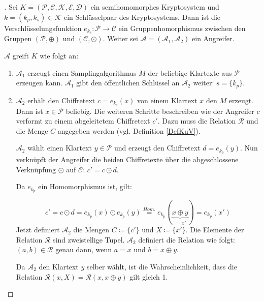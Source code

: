 \begin{proof}[]
 Sei $K = (\mathcal{P},\mathcal{C},\mathcal{K},\mathcal{E},\mathcal{D})$ ein semihomomorphes Kryptosystem und $k=(k_p,k_s)\in\mathcal{K}$ ein Schlüsselpaar des Kryptosystems. Dann ist die Verschlüsselungsfunktion $e_{k_s}:\mathcal{P}\rightarrow\mathcal{C}$ ein Gruppenhomorphismus zwischen den Gruppen $(\mathcal{P},\oplus)$ und $(\mathcal{C},\odot)$. Weiter sei $\mathcal{A} = (\mathcal{A}_1,\mathcal{A}_2)$ ein Angreifer.
 
$\mathcal{A}$ greift $K$ wie folgt an:
 
 \begin{enumerate}
 	\item $\mathcal{A}_1$ erzeugt einen Samplingalgorithmus $M$ der beliebige Klartexte aus $\mathcal{P}$ erzeugen kann. $\mathcal{A}_1$ gibt den öffentlichen Schlüssel an $\mathcal{A}_2$ weiter: $s=\{k_p\}$. 
 	\item  $\mathcal{A}_2$ erhält den Chiffretext $c=e_{k_s}(x)$ von einem Klartext $x$ den $M$ erzeugt.  
 	Dann ist  $x\in\mathcal{P}$ beliebig. Die weiteren Schritte beschreiben wie der Angreifer $c$ verformt zu einem abgeleitetem Chiffretext $c'$. Dazu muss die Relation $\mathcal{R}$ und die Menge $C$ angegeben werden (vgl. Definition \ref{DefKuV}).
 
	$\mathcal{A}_2$ wählt einen Klartext $y\in\mathcal{P}$ und erzeugt den Chiffretext $d=e_{k_p}(y)$. Nun verknüpft der Angreifer die beiden Chiffretexte über die abgeschlossene Verknüpfung $\odot$ auf $\mathcal{C}$: $c'=c\odot d$.
	
	Da $e_{k_p}$ ein Homomorphismus ist, gilt:
	
	\begin{equation*}
	c'=c\odot d = e_{k_p}(x)\odot e_{k_p}(y) \stackrel{Hom.}{=} e_{k_p}(\underbrace{x\oplus y}_{\eqqcolon x'})=e_{k_p}(x')
	\end{equation*}
	Jetzt definiert $\mathcal{A}_2$ die Mengen $C\coloneqq\{c'\}$ und $X\coloneqq\{x'\}$. Die Elemente der Relation $\mathcal{R}$ sind zweistellige Tupel. $\mathcal{A}_2$ definiert die Relation wie folgt: $(a,b)\in\mathcal{R}$ genau dann, wenn $a=x$ und $b = x\oplus y$.
	
	Da $\mathcal{A}_2$ den Klartext $y$ selber wählt, ist die Wahrscheinlichkeit, dass die Relation $\mathcal{R}(x,X)=\mathcal{R}(x,x\oplus y)$ gilt gleich 1.
	

\end{enumerate}
\end{proof}
